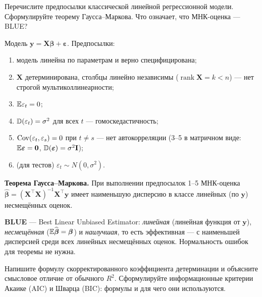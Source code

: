 
Перечислите предпосылки классической линейной регрессионной модели.
Сформулируйте теорему Гаусса--Маркова. Что означает, что МНК-оценка —
BLUE?

\begin{solution}
Модель $\mathbf{y} = \mathbf{X}\boldsymbol{\beta} + \boldsymbol{\varepsilon}$.
Предпосылки:
\begin{enumerate}[label=\arabic*), leftmargin=2.2em, itemsep=2pt]
  \item модель линейна по параметрам и верно специфицирована;
  \item $\mathbf{X}$ детерминирована, столбцы линейно независимы
        ($\operatorname{rank}\mathbf{X} = k < n$) — нет строгой
        мультиколлинеарности;
  \item $\mathbb{E}\varepsilon_t = 0$;
  \item $\mathbb{D}(\varepsilon_t) = \sigma^2$ для всех $t$ — гомоскедастичность;
  \item $\mathrm{Cov}(\varepsilon_t, \varepsilon_s) = 0$ при $t \ne s$ — нет
        автокорреляции (3–5 в матричном виде: $\mathbb{E}\boldsymbol{\varepsilon} =
        \mathbf{0}$, $\mathbb{D}(\boldsymbol{\varepsilon}) = \sigma^2\mathbf{I}$);
  \item (для тестов) $\varepsilon_t \sim N(0, \sigma^2)$.
\end{enumerate}

\textbf{Теорема Гаусса--Маркова.} При выполнении предпосылок 1–5 МНК-оценка
$\widehat{\boldsymbol{\beta}} = (\mathbf{X}^{\top}\mathbf{X})^{-1}\mathbf{X}^{\top}\mathbf{y}$
имеет наименьшую дисперсию в классе линейных (по $\mathbf{y}$) несмещённых
оценок.

\textbf{BLUE} — Best Linear Unbiased Estimator: \emph{линейная} (линейная
функция от $\mathbf{y}$), \emph{несмещённая} ($\mathbb{E}\widehat{\boldsymbol{\beta}} =
\boldsymbol{\beta}$) и \emph{наилучшая}, то есть эффективная — с наименьшей
дисперсией среди всех линейных несмещённых оценок. Нормальность ошибок для
теоремы не нужна.
\end{solution}


Напишите формулу скорректированного коэффициента детерминации и объясните
смысловое отличие от обычного $R^2$. Сформулируйте информационные критерии
Акаике (AIC) и Шварца (BIC): формулы и для чего они используются.

